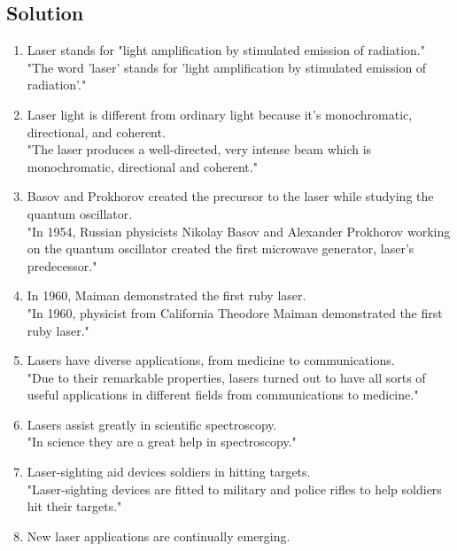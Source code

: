 \subsection*{Solution}
\begin{enumerate}
      \item Laser stands for "light amplification by stimulated emission of radiation." \\
            "The word 'laser' stands for 'light amplification by stimulated emission
            of radiation'." 
      \item Laser light is different from ordinary light because it's monochromatic,
            directional, and coherent. \\
            "The laser produces a well-directed, very intense beam which is monochromatic,
            directional and coherent." 
      \item Basov and Prokhorov created the precursor to the laser while studying the
            quantum oscillator. \\
            "In 1954, Russian physicists Nikolay Basov and Alexander Prokhorov working
            on the quantum oscillator created the first microwave generator, laser’s
            predecessor." 
      \item In 1960, Maiman demonstrated the first ruby laser. \\
            "In 1960, physicist from California Theodore Maiman demonstrated the first
            ruby laser." 
      \item Lasers have diverse applications, from medicine to communications. \\
            "Due to their remarkable properties, lasers turned out to have all sorts
            of useful applications in different fields from communications to medicine."
      \item Lasers assist greatly in scientific spectroscopy. \\
            "In science they are a great help in spectroscopy."
      \item Laser-sighting aid devices soldiers in hitting targets. \\
            "Laser-sighting devices are fitted to military and police rifles to help
            soldiers hit their targets." 
      \item New laser applications are continually emerging. \\

\end{enumerate}
